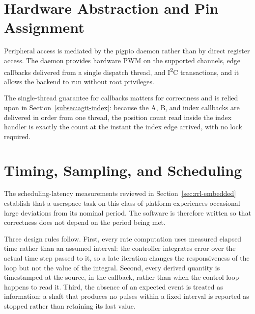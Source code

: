 \section{Hardware Abstraction and Pin Assignment}
\label{sec:plat-hal}

Peripheral access is mediated by the pigpio daemon rather than by direct register access. The daemon provides hardware PWM on the supported channels, edge callbacks delivered from a single dispatch thread, and I\textsuperscript{2}C transactions, and it allows the backend to run without root privileges.

The single-thread guarantee for callbacks matters for correctness and is relied upon in Section~\ref{subsec:agit-index}: because the A, B, and index callbacks are delivered in order from one thread, the position count read inside the index handler is exactly the count at the instant the index edge arrived, with no lock required.



\section{Timing, Sampling, and Scheduling}
\label{sec:plat-timing}

The scheduling-latency measurements reviewed in Section~\ref{sec:rrl-embedded} establish that a userspace task on this class of platform experiences occasional large deviations from its nominal period. The software is therefore written so that correctness does not depend on the period being met.

Three design rules follow. First, every rate computation uses measured elapsed time rather than an assumed interval: the controller integrates error over the actual time step passed to it, so a late iteration changes the responsiveness of the loop but not the value of the integral. Second, every derived quantity is timestamped at the source, in the callback, rather than when the control loop happens to read it. Third, the absence of an expected event is treated as information: a shaft that produces no pulses within a fixed interval is reported as stopped rather than retaining its last value.

